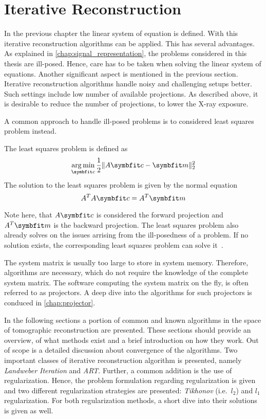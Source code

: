 \section{Iterative Reconstruction}\label{sec:iterative_reconstruction}

In the previous chapter the linear system of equation is defined. With this iterative reconstruction
algorithms can be applied. This has several advantages. As explained in
\autoref{chap:signal_representation}, the problems considered in this thesis are ill-posed. Hence,
care has to be taken when solving the linear system of equations. Another significant aspect is
mentioned in the previous section. Iterative reconstruction algorithms handle noisy and challenging
setups better. Such settings include low number of available projections. As described above, it is
desirable to reduce the number of projections, to lower the X-ray exposure.

A common approach to handle ill-posed problems is to considered least squares problem instead.
\begin{definition}\label{def:least_squares_problem}
	The least squares problem is defined as
	\[ \argmin_{\mvec{c}} \frac{1}{2} \norm{A\mvec{c} - \mvec{m}}^2_2 \]
	The solution to the least squares problem is given by the normal equation
	\[ A^T A \mvec{c} = A^T \mvec{m} \]
\end{definition}
Note here, that \(A\mvec{c}\) is considered the forward projection and \(A^T \mvec{m}\) is the
backward projection. The least squares problem also already solves on the issues arrising from the
ill-posedness of a problem. If no solution exists, the corresponding least squares problem can solve
it~\cite{hansen_discrete_2010}.

The system matrix is usually too large to store in system memory. Therefore, algorithms are
necessary, which do not require the knowledge of the complete system matrix. The software computing
the system matrix on the fly, is often referred to as projectors. A deep dive into the algorithms
for such projectors is conduced in \autoref{chap:projector}.

In the following sections a portion of common and known algorithms in the space of tomographic
reconstruction are presented. These sections should provide an overview, of what methods exist and
a brief introduction on how they work. Out of scope is a detailed discussion about convergence of
the algorithms. Two important classes of iterative reconstruction algorithm is presented, namely
\textit{Landweber Iteration} and \textit{\gls{ART}}. Further, a common addition is the use of regularization.
Hence, the problem formulation regarding regularization is given and two different regularization
strategies are presented: \textit{Tikhonov} (i.e.\ \(l_2\)) and \(l_1\) regularization. For both
regularization methods, a short dive into their solutions is given as well.

